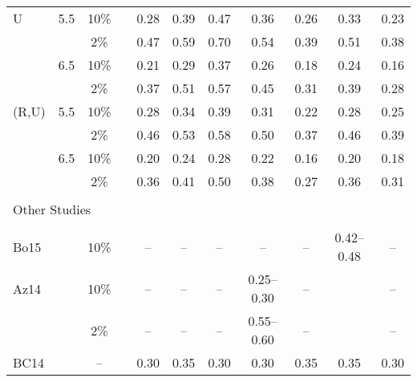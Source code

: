 \begin{table*}[t]
\begin{tabular}{lcccccccccc}
    U       &   5.5 &  10\%  &&   0.28      &   0.39      &   0.47      &   0.36      &   0.26      &   0.33      &   0.23      \\
            &       &   2\%  &&   0.47      &   0.59      &   0.70      &   0.54      &   0.39      &   0.51      &   0.38      \\
            &   6.5 &  10\%  &&   0.21      &   0.29      &   0.37      &   0.26      &   0.18      &   0.24      &   0.16      \\
            &       &   2\%  &&   0.37      &   0.51      &   0.57      &   0.45      &   0.31      &   0.39      &   0.28      \\
    (R,U)   &   5.5 &  10\%  &&   0.28      &   0.34      &   0.39      &   0.31      &   0.22      &   0.28      &   0.25      \\
            &       &   2\%  &&   0.46      &   0.53      &   0.58      &   0.50      &   0.37      &   0.46      &   0.39      \\
            &   6.5 &  10\%  &&   0.20      &   0.24      &   0.28      &   0.22      &   0.16      &   0.20      &   0.18      \\
            &       &   2\%  &&   0.36      &   0.41      &   0.50      &   0.38      &   0.27      &   0.36      &   0.31      \\[0.6ex]
    \hline                                                                                                                      \\[-1.6ex]
    \multicolumn{3}{l}{Other Studies}                                                                                           \\[0.6ex]
    \cline{1-3} \cline{5-11}                                                                                                    \\[-1.6ex]
    \multicolumn{2}{l}{Bo15}
                    &  10\%  &&   --        &   --        &   --        &   --        &   --        & 0.42--0.48  &   --        \\
    \multicolumn{2}{l}{Az14}
                    &  10\%  &&   --        &   --        &   --        & 0.25--0.30  &   --        &             &   --        \\
            &       &   2\%  &&   --        &   --        &   --        & 0.55--0.60  &   --        &             &   --        \\
    \multicolumn{2}{l}{BC14}
                    &  --    &&   0.30      &   0.35      &   0.30      &   0.30      &   0.35      &   0.35      &   0.30      \\

\end{tabular}
\end{table*}

